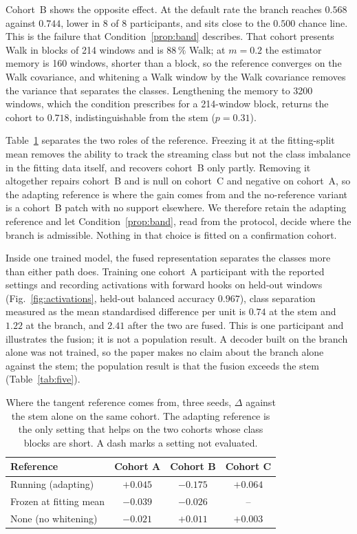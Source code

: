 \documentclass[a4paper,fleqn]{cas-dc}
\begin{document}
Cohort~B shows the opposite effect. At the default rate the branch reaches $0.568$ against $0.744$, lower in 8 of 8 participants, and sits close to the $0.500$ chance line. This is the failure that Condition~\ref{prop:band} describes. That cohort presents Walk in blocks of 214 windows and is $88\,\%$ Walk; at $m=0.2$ the estimator memory is 160 windows, shorter than a block, so the reference converges on the Walk covariance, and whitening a Walk window by the Walk covariance removes the variance that separates the classes. Lengthening the memory to 3200 windows, which the condition prescribes for a 214-window block, returns the cohort to $0.718$, indistinguishable from the stem ($p=0.31$).

Table~\ref{tab:tanref} separates the two roles of the reference. Freezing it at the fitting-split mean removes the ability to track the streaming class but not the class imbalance in the fitting data itself, and recovers cohort~B only partly. Removing it altogether repairs cohort~B and is null on cohort~C and negative on cohort~A, so the adapting reference is where the gain comes from and the no-reference variant is a cohort~B patch with no support elsewhere. We therefore retain the adapting reference and let Condition~\ref{prop:band}, read from the protocol, decide where the branch is admissible. Nothing in that choice is fitted on a confirmation cohort.

Inside one trained model, the fused representation separates the classes more than either path does. Training one cohort~A participant with the reported settings and recording activations with forward hooks on held-out windows (Fig.~\ref{fig:activations}, held-out balanced accuracy $0.967$), class separation measured as the mean standardised difference per unit is $0.74$ at the stem and $1.22$ at the branch, and $2.41$ after the two are fused. This is one participant and illustrates the fusion; it is not a population result. A decoder built on the branch alone was not trained, so the paper makes no claim about the branch alone against the stem; the population result is that the fusion exceeds the stem (Table~\ref{tab:five}).

\begin{table}[t]
\centering
\caption{Where the tangent reference comes from, three seeds, $\Delta$ against the stem alone on the same cohort. The adapting reference is the only setting that helps on the two cohorts whose class blocks are short. A dash marks a setting not evaluated.}
\label{tab:tanref}
\begin{tabular}{lccc}
\hline
Reference & Cohort A & Cohort B & Cohort C \\
\hline
Running (adapting) & $+0.045$ & $-0.175$ & $+0.064$ \\
Frozen at fitting mean & $-0.039$ & $-0.026$ & -- \\
None (no whitening) & $-0.021$ & $+0.011$ & $+0.003$ \\
\hline
\end{tabular}
\end{table}
\end{document}
